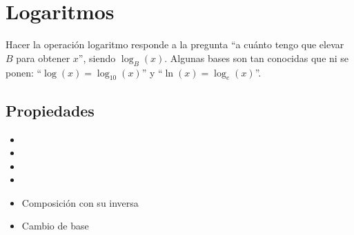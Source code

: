\section{Logaritmos}

Hacer la operación logaritmo responde a la pregunta ``a cuánto tengo que elevar $B$ para obtener $x$'', siendo $\log_B(x)$. Algunas bases son tan conocidas que ni se ponen: ``$\log(x) = \log_{10}(x)$'' y ``$\ln(x) = \log_{e}(x)$''.

\subsection*{Propiedades }
\begin{itemize}
\item {}
\item {}
\item {}
\item {}
\item {}
Composición con su inversa
\item {}
Cambio de base
\end{itemize}


